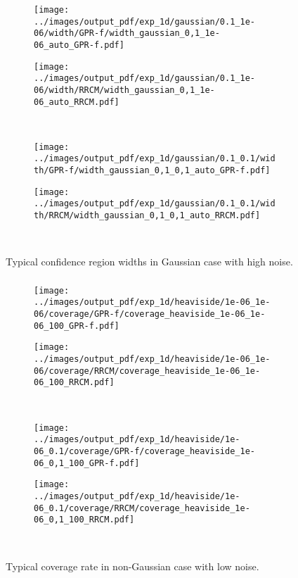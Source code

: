 \documentclass[t]{beamer}  %
\begin{document}
\begin{frame}[t]\frametitle{\insertsection}
  \begin{figure}
    \centering
    \begin{subfigure}[b]{0.5\linewidth}
      \texttt{[image: ../images/output\_pdf/exp\_1d/gaussian/0.1\_1e-06/width/GPR-f/width\_gaussian\_0,1\_1e-06\_auto\_GPR-f.pdf]}
    \end{subfigure}%
    \begin{subfigure}[b]{0.5\linewidth}
      \texttt{[image: ../images/output\_pdf/exp\_1d/gaussian/0.1\_1e-06/width/RRCM/width\_gaussian\_0,1\_1e-06\_auto\_RRCM.pdf]}
    \end{subfigure}\\
    \begin{subfigure}[b]{0.5\linewidth}
      \texttt{[image: ../images/output\_pdf/exp\_1d/gaussian/0.1\_0.1/width/GPR-f/width\_gaussian\_0,1\_0,1\_auto\_GPR-f.pdf]}
    \end{subfigure}%
    \begin{subfigure}[b]{0.5\linewidth}
      \texttt{[image: ../images/output\_pdf/exp\_1d/gaussian/0.1\_0.1/width/RRCM/width\_gaussian\_0,1\_0,1\_auto\_RRCM.pdf]}
    \end{subfigure}\\
    \caption{Typical confidence region widths in Gaussian case with high noise.}
    \label{fig:gaussian_1d_high_noise_width}
  \end{figure}
\end{frame}

\begin{frame}[t]\frametitle{\insertsection}
  \begin{figure}%
    \centering
    \begin{subfigure}[b]{0.25\linewidth}
      \texttt{[image: ../images/output\_pdf/exp\_1d/heaviside/1e-06\_1e-06/coverage/GPR-f/coverage\_heaviside\_1e-06\_1e-06\_100\_GPR-f.pdf]}
    \end{subfigure}%
    \begin{subfigure}[b]{0.25\linewidth}
      \texttt{[image: ../images/output\_pdf/exp\_1d/heaviside/1e-06\_1e-06/coverage/RRCM/coverage\_heaviside\_1e-06\_1e-06\_100\_RRCM.pdf]}
    \end{subfigure}\\
    \begin{subfigure}[b]{0.25\linewidth}
      \texttt{[image: ../images/output\_pdf/exp\_1d/heaviside/1e-06\_0.1/coverage/GPR-f/coverage\_heaviside\_1e-06\_0,1\_100\_GPR-f.pdf]}
    \end{subfigure}%
    \begin{subfigure}[b]{0.25\linewidth}
      \texttt{[image: ../images/output\_pdf/exp\_1d/heaviside/1e-06\_0.1/coverage/RRCM/coverage\_heaviside\_1e-06\_0,1\_100\_RRCM.pdf]}
    \end{subfigure}\\
    \caption{Typical coverage rate in non-Gaussian case with low noise.}
    \label{fig:heaviside_1d_low_noise}
  \end{figure}
\end{frame}
\end{document}
